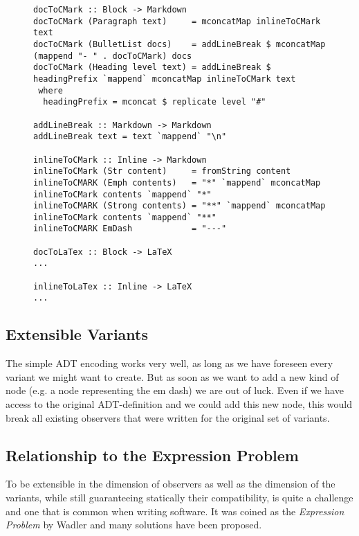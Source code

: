 \documentclass[format=acmsmall, review=true, screen=true, natbib=false]{acmart}
\begin{document}
\begin{figure}
\begin{lstlisting}
docToCMark :: Block -> Markdown
docToCMark (Paragraph text)     = mconcatMap inlineToCMark text
docToCMark (BulletList docs)    = addLineBreak $ mconcatMap (mappend "- " . docToCMark) docs
docToCMark (Heading level text) = addLineBreak $ headingPrefix `mappend` mconcatMap inlineToCMark text
 where
  headingPrefix = mconcat $ replicate level "#"

addLineBreak :: Markdown -> Markdown
addLineBreak text = text `mappend` "\n"

inlineToCMark :: Inline -> Markdown
inlineToCMark (Str content)     = fromString content
inlineToCMARK (Emph contents)   = "*" `mappend` mconcatMap inlineToCMark contents `mappend` "*"
inlineToCMARK (Strong contents) = "**" `mappend` mconcatMap inlineToCMark contents `mappend` "**"
inlineToCMARK EmDash            = "---"

docToLaTex :: Block -> LaTeX
...

inlineToLaTex :: Inline -> LaTeX
...
\end{lstlisting}
\end{figure}


\clearpage

\subsection{Extensible Variants}
\label{sec:orgccbaf12}

The simple ADT encoding works very well, as long as we have foreseen every
variant we might want to create. But as soon as we want to add a new kind of
node (e.g. a node representing the em dash) we are out of luck. Even if we have
access to the original ADT-definition and we could add this new node, this would
break all existing observers that were written for the original set of variants.

\subsection{Relationship to the Expression Problem}
\label{sec:orgb21dca4}

To be extensible in the dimension of observers as well as the dimension of the
variants, while still guaranteeing statically their compatibility, is quite a
challenge and one that is common when writing software. It was coined as the
\emph{Expression Problem} by Wadler \cite{expression-problem} and many solutions
have been proposed.
\end{document}
